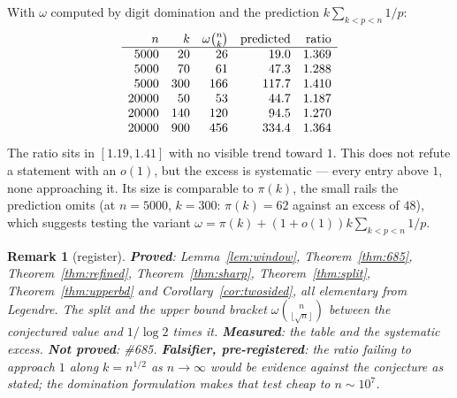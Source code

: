 \documentclass[11pt]{article}
\newtheorem{remark}[theorem]{Remark}
\begin{document}
With $\omega$ computed by digit domination and the prediction $k\sum_{k<p<n}1/p$:
\[
\begin{array}{r r r r r}
 n & k & \omega\binom nk & \text{predicted} & \text{ratio}\\\hline
 5000 & 20 & 26 & 19.0 & 1.369\\
 5000 & 70 & 61 & 47.3 & 1.288\\
 5000 & 300 & 166 & 117.7 & 1.410\\
 20000 & 50 & 53 & 44.7 & 1.187\\
 20000 & 140 & 120 & 94.5 & 1.270\\
 20000 & 900 & 456 & 334.4 & 1.364
\end{array}
\]
The ratio sits in $[1.19,1.41]$ with no visible trend toward $1$.  This does not refute a
statement with an $o(1)$, but the excess is systematic --- every entry above $1$, none
approaching it.  Its size is comparable to $\pi(k)$, the small rails the prediction omits
(at $n=5000$, $k=300$: $\pi(k)=62$ against an excess of $48$), which suggests testing the
variant $\omega=\pi(k)+(1+o(1))k\sum_{k<p<n}1/p$.

\begin{remark}[register]
\textbf{Proved}: Lemma~\ref{lem:window}, Theorem~\ref{thm:685}, Theorem~\ref{thm:refined},
Theorem~\ref{thm:sharp}, Theorem~\ref{thm:split}, Theorem~\ref{thm:upperbd} and
Corollary~\ref{cor:twosided}, all elementary from Legendre.  The split and the upper bound
bracket $\omega\binom{n}{\lfloor\sqrt n\rfloor}$ between the conjectured value and
$1/\log2$ times it.  \textbf{Measured}: the table and the systematic excess.
\textbf{Not proved}: \#685.  \textbf{Falsifier, pre-registered}: the ratio failing to
approach $1$ along $k=n^{1/2}$ as $n\to\infty$ would be evidence against the conjecture as
stated; the domination formulation makes that test cheap to $n\sim10^{7}$.
\end{remark}
\end{document}
